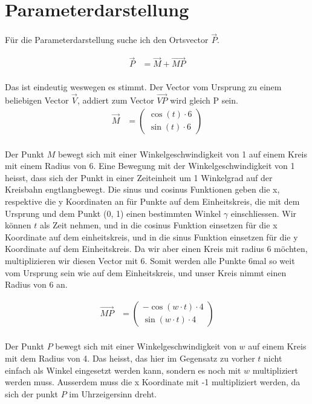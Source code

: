\documentclass[12pt, a4paper, twoside]{article}
\begin{document}
\section{Parameterdarstellung}
Für die Parameterdarstellung suche ich den Ortsvector $\vec{P}$.

\begin{align*}
  \overrightarrow{P} & = \overrightarrow{M} + \overrightarrow{MP} \\
\end{align*}

Das ist eindeutig weswegen es stimmt.
Der Vector vom Ursprung zu einem beliebigen Vector $\overrightarrow{V}$, addiert zum Vector $\overrightarrow{VP}$ wird gleich P sein.
\\

\begin{align*}
  \overrightarrow{M} & = \begin{pmatrix}
    \cos(t) \cdot 6
    \\
    \sin(t) \cdot 6
  \end{pmatrix} \\
\end{align*}

Der Punkt $M$ bewegt sich mit einer Winkelgeschwindigkeit von 1 auf einem Kreis mit einem Radius von 6.
Eine Bewegung mit der Winkelgeschwindigkeit von 1 heisst, dass sich der Punkt in einer Zeiteinheit um 1 Winkelgrad auf der Kreisbahn engtlangbewegt.
Die sinus und cosinus Funktionen geben die x, respektive die y Koordinaten an für Punkte auf dem Einheitskreis, die mit dem Ursprung und dem Punkt (0, 1) einen bestimmten Winkel $\gamma$ einschliessen.
Wir können $t$ als Zeit nehmen, und in die cosinus Funktion einsetzen für die x Koordinate auf dem einheitskreis, und in die sinus Funktion einsetzen für die y Koordinate auf dem Einheitskreis.
Da wir aber einen Kreis mit radius 6 möchten, multiplizieren wir diesen Vector mit 6.
Somit werden alle Punkte 6mal so weit vom Ursprung sein wie auf dem Einheitskreis, und unser Kreis nimmt einen Radius von 6 an.

\begin{align*}
  \overrightarrow{MP} & = \begin{pmatrix}
    -\cos(w\cdot t) \cdot 4
    \\
    \sin(w\cdot t) \cdot 4
  \end{pmatrix}
\end{align*}
\\

Der Punkt $P$ bewegt sich mit einer Winkelgeschwindigkeit von $w$ auf einem Kreis mit dem Radius von 4.
Das heisst, das hier im Gegensatz zu vorher $t$ nicht einfach als Winkel eingesetzt werden kann, sondern es noch mit $w$ multipliziert werden muss.
Ausserdem muss die x Koordinate mit -1 multipliziert werden, da sich der punkt $P$ im Uhrzeigersinn dreht.
\end{document}
